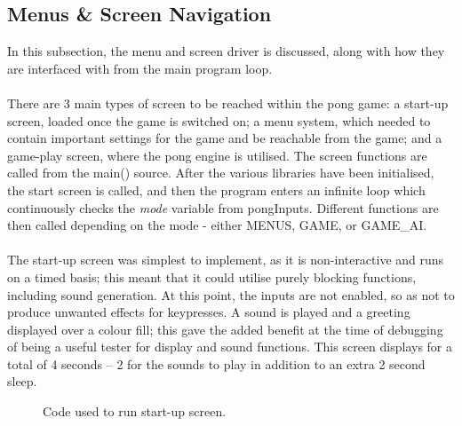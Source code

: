 \documentclass[a4paper,12pt]{article}
\begin{document}
\subsection{Menus {\&} Screen Navigation}
\begin{flushleft}
In this subsection, the menu and screen driver is discussed, along with how they are interfaced with from the main program loop.
\\ \- \\
There are 3 main types of screen to be reached within the pong game: a start-up screen, loaded once the game is switched on; a menu system, which needed to contain important settings for the game and be reachable from the game; and a game-play screen, where the pong engine is utilised. The screen functions are called from the main() source. After the various libraries have been initialised, the start screen is called, and then the program enters an infinite loop which continuously checks the \textit{mode} variable from pongInputs. Different functions are then called depending on the mode - either MENUS, GAME, or GAME\_AI.
\\ \- \\  
The start-up screen was simplest to implement, as it is non-interactive and runs on a timed basis; this meant that it could utilise purely blocking functions, including sound generation. At this point, the inputs are not enabled, so as not to produce unwanted effects for keypresses. A sound is played and a greeting displayed over a colour fill; this gave the added benefit at the time of debugging of being a useful tester for display and sound functions. This screen displays for a total of 4 seconds – 2 for the sounds to play in addition to an extra 2 second sleep.
\begin{figure}[H]
  \centering
  
    \caption{Code used to run start-up screen.}
\end{figure}
\- \\
\begin{figure}[H]
  \centering

\end{figure}
\end{flushleft}
\end{document}
